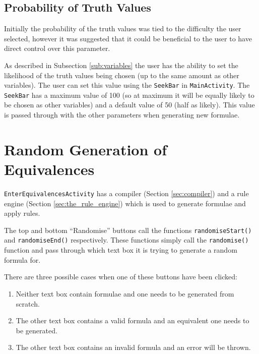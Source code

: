 \documentclass{report}
\begin{document}
\subsection{Probability of Truth Values}

Initially the probability of the truth values was tied to the difficulty the user selected, however it was suggested that it could be beneficial to the user to have direct control over this parameter. 

As described in Subsection \ref{sub:variables} the user has the ability to set the likelihood of the truth values being chosen (up to the same amount as other variables). The user can set this value using the {\tt SeekBar} in {\tt MainActivity}. The {\tt SeekBar} has a maximum value of 100 (so at maximum it will be equally likely to be chosen as other variables) and a default value of 50 (half as likely). This value is passed through with the other parameters when generating new formulae.

\section{Random Generation of Equivalences}
\label{sec:app_generation_of_equivalences}

{\tt EnterEquivalencesActivity} has a compiler (Section \ref{sec:compiler}) and a rule engine (Section \ref{sec:the_rule_engine}) which is used to generate formulae and apply rules.

The top and bottom ``Randomise'' buttons call the functions {\tt randomiseStart()} and {\tt randomiseEnd()} respectively. These functions simply call the {\tt randomise()} function and pass through which text box it is trying to generate a random formula for.

There are three possible cases when one of these buttons have been clicked:

\begin{enumerate}[leftmargin=*, align=left, label=\bfseries Case \arabic*:]
\item Neither text box contain formulae and one needs to be generated from scratch.

\item The other text box contains a valid formula and an equivalent one needs to be generated.

\item The other text box contains an invalid formula and an error will be thrown.
\end{enumerate}
\end{document}
